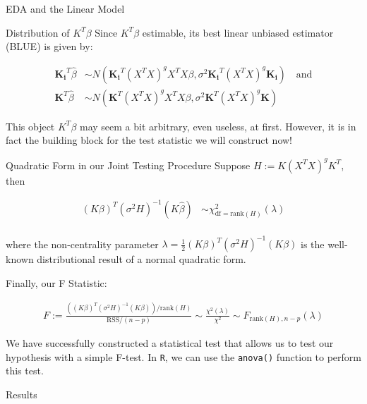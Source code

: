 \documentclass[
  ignorenonframetext,
]{beamer}
\begin{document}
\begin{frame}[fragile]{EDA and the Linear Model}
\begin{block}{Distribution of \(K^T \beta\)}
\label{distribution-of-kt-beta}
Since \(K^T \beta\) estimable, its best linear unbiased estimator (BLUE)
is given by:

\[
\begin{aligned}
\mathbf{K_i}^T \hat{\beta} &\sim \textit{N}(\mathbf{K_i}^T (X^T X)^g X^T X \beta, \sigma^2 \mathbf{K_i}^T(X^TX)^{g}\mathbf{K_i}) \quad \text{and} \\ 
\mathbf{K}^T \hat{\beta} &\sim \textit{N}(\mathbf{K}^T (X^T X)^g X^T X \beta, \sigma^2 \mathbf{K}^T(X^TX)^{g}\mathbf{K}) 
\end{aligned}
\]

This object \(K^T \beta\) may seem a bit arbitrary, even useless, at
first. However, it is in fact the building block for the test statistic
we will construct now!
\end{block}

\begin{block}{Quadratic Form in our Joint Testing Procedure}
\label{quadratic-form-in-our-joint-testing-procedure}
Suppose \(H := K (X^T X)^g K^T\), then

\[
\begin{aligned}
(K \beta)^T (\sigma^2 H)^{-1} (K \hat{\beta}) &\sim \chi^2_{\text{df} = \text{rank}(H)}(\lambda) \\
\end{aligned}
\]

where the non-centrality parameter
\(\lambda = \frac{1}{2} (K \beta)^T (\sigma^2 H)^{-1}(K \beta)\) is the
well-known distributional result of a normal quadratic form.

Finally, our F Statistic:

\[
\begin{aligned}
F := \frac{\left((K \beta)^T (\sigma^2 H)^{-1}(K \beta)\right) / \text{rank}(H)}{\text{RSS}/(n-p)}
\sim \frac{\chi^2 (\lambda)}{\chi^2} \sim F_{\text{rank}(H), n-p}(\lambda)
\end{aligned}
\]

We have successfully constructed a statistical test that allows us to
test our hypothesis with a simple F-test. In \texttt{R}, we can use the
\texttt{anova()} function to perform this test.
\end{block}

\begin{block}{Results}
\label{results}
\begin{figure}[H]


\end{figure}
\end{block}
\end{frame}
\end{document}
